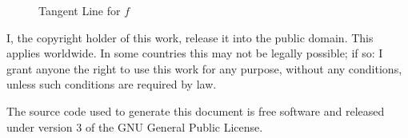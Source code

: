 \documentclass{article}
\begin{document}
    \begin{figure}
        \centering
        \caption{Tangent Line for $f$}
        \label{fig:tan_line}
    \end{figure}
    \newpage
    I, the copyright holder of this work, release it into the public domain.
    This applies worldwide. In some countries this may not be legally possible;
    if so: I grant anyone the right to use this work for any purpose, without
    any conditions, unless such conditions are required by law.
    \par\hfill\par
    The source code used to generate this document is free software and released
    under version 3 of the GNU General Public License.
\end{document}
